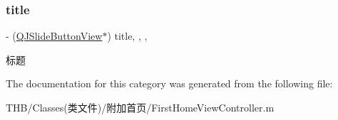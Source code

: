 \subsubsection{\texorpdfstring{title}{title}}
{\footnotesize\ttfamily -\/ (\mbox{\hyperlink{interface_q_j_slide_button_view}{Q\+J\+Slide\+Button\+View}}$\ast$) title\hspace{0.3cm}{\ttfamily [read]}, {\ttfamily [write]}, {\ttfamily [nonatomic]}, {\ttfamily [strong]}}

标题 

The documentation for this category was generated from the following file\+:\begin{DoxyCompactItemize}
\item 
T\+H\+B/\+Classes(类文件)/附加首页/First\+Home\+View\+Controller.\+m\end{DoxyCompactItemize}
